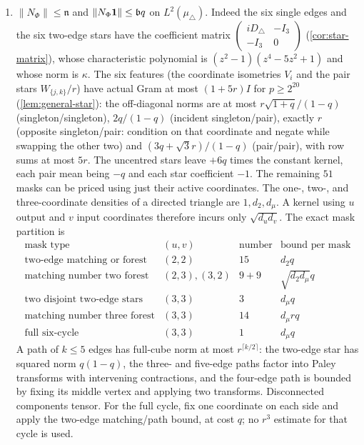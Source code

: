 \begin{enumerate}[label=(L\arabic*)]
\item $\|N_\Phi\|\le\mathfrak n$ and $\|N_\Phi\mathbf 1\|\le\mathfrak bq$ on $L^2(\mu_\triangle)$.
 Indeed the six single edges and the six two-edge stars have the coefficient matrix
 $\left(\begin{smallmatrix}iD_\triangle&-I_3\\-I_3&0\end{smallmatrix}\right)$
 (\cref{cor:star-matrix}), whose characteristic polynomial is $(z^2-1)(z^4-5z^2+1)$ and whose
 norm is $\kappa$. The six features (the coordinate isometries $V_i$ and the pair stars
 $W_{\{j,k\}}/r$) have actual Gram at most $(1+5r)I$ for $p\ge2^{20}$
 (\cref{lem:general-star}): the off-diagonal norms are at most $r\sqrt{1+q}/(1-q)$
 (singleton/singleton), $2q/(1-q)$ (incident singleton/pair), exactly $r$ (opposite
 singleton/pair: condition on that coordinate and negate while swapping the other two)
 and $(3q+\sqrt3r)/(1-q)$ (pair/pair), with row sums at most $5r$. The uncentred stars
 leave $+6q$ times the constant kernel, each pair mean being $-q$ and each star
 coefficient $-1$. The remaining $51$ masks can be priced using just
 their active coordinates. The one-, two-, and three-coordinate densities
 of a directed triangle are $1,d_2,d_\mu$. A kernel using $u$ output and
 $v$ input coordinates therefore incurs only $\sqrt{d_ud_v}$.
 The exact mask partition is
 \[
 \begin{array}{c|c|c|c}
 \text{mask type}&(u,v)&\text{number}&\text{bound per mask}\\ \hline
 \text{two-edge matching or forest}&(2,2)&15&d_2q\\
 \text{matching number two forest}&(2,3),(3,2)&9+9&\sqrt{d_2d_\mu}q\\
 \text{two disjoint two-edge stars}&(3,3)&3&d_\mu q\\
 \text{matching number three forest}&(3,3)&14&d_\mu rq\\
 \text{full six-cycle}&(3,3)&1&d_\mu q
 \end{array}
 \]
 A path of $k\le5$ edges has full-cube norm at most
 $r^{\lceil k/2\rceil}$: the two-edge star has squared norm
 $q(1-q)$, the three- and five-edge paths factor into Paley
 transforms with intervening contractions, and the four-edge path
 is bounded by fixing its middle vertex and applying two transforms.
 Disconnected components tensor. For the full cycle, fix one
 coordinate on each side and apply the two-edge matching/path
 bound, at cost $q$; no $r^3$ estimate for that cycle is used.

\end{enumerate}

